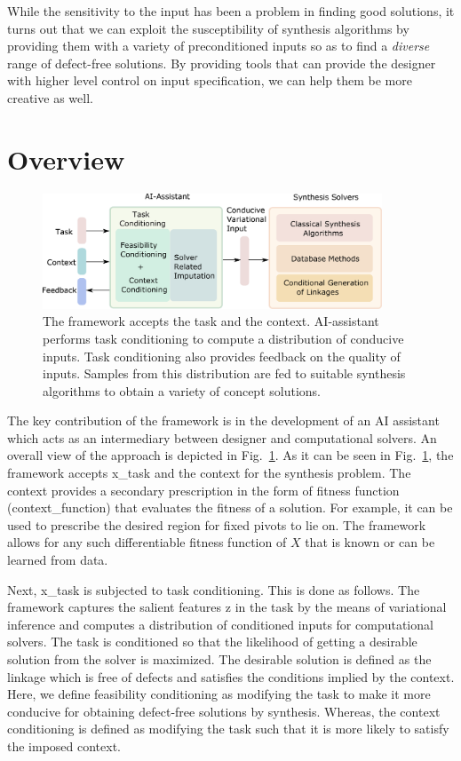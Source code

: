 While the sensitivity to the input has been a problem in finding good solutions, it turns out that we can exploit the susceptibility of synthesis algorithms by providing them with a variety of preconditioned inputs so as to find a \emph{diverse} range of defect-free solutions. By providing tools that can provide the designer with higher level control on input specification, we can help them be more creative as well.


\section{Overview}

\begin{figure}
\centering
\includegraphics[width=0.9\textwidth]{figure/overview.eps}
  \caption{The framework accepts the task and the context. AI-assistant performs task conditioning to compute a distribution of conducive inputs. Task conditioning also provides feedback on the quality of inputs. Samples from this distribution are fed to suitable synthesis algorithms to obtain a variety of concept solutions.}
\label{fig_overview}
\end{figure}

The key contribution of the framework is in the development of an AI assistant which acts as an intermediary between designer and computational solvers. An overall view of the approach is depicted in Fig.~\ref{fig_overview}. As it can be seen in Fig.~\ref{fig_overview}, the framework accepts \ac{x_task} and the context for the synthesis problem. The context provides a secondary prescription in the form of fitness function (\ac{context_function}) that evaluates the fitness of a solution. For example, it can be used to prescribe the desired region for fixed pivots to lie on. The framework allows for any such differentiable fitness function of $X$ that is known or can be learned from data. 


Next, \ac{x_task} is subjected to task conditioning. This is done as follows. The framework captures the salient features \ac{z} in the task by the means of variational inference and computes a distribution of conditioned inputs for computational solvers. The task is conditioned so that the likelihood of getting a desirable solution from the solver is maximized. The desirable solution is defined as the linkage which is free of defects and satisfies the conditions implied by the context. Here, we define feasibility conditioning as modifying the task to make it more conducive for obtaining defect-free solutions by synthesis. Whereas, the context conditioning is defined as modifying the task such that it is more likely to satisfy the imposed context. 


